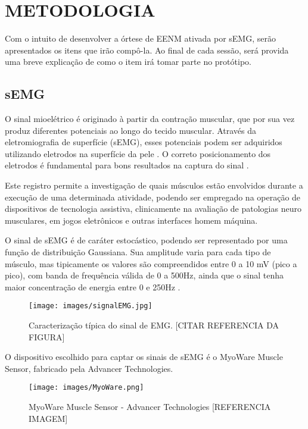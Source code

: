\documentclass[rascunho,xindy]{fei}
\begin{document}
\chapter{METODOLOGIA}

Com o intuito de desenvolver a órtese de EENM ativada por sEMG, serão apresentados os itens que irão compô-la. Ao final de cada sessão, será provida uma breve explicação de como o item irá tomar parte no protótipo.


\section{sEMG}

O sinal mioelétrico é originado à partir da contração muscular, que por sua vez produz diferentes potenciais ao longo do tecido muscular. Através da eletromiografia de superfície (sEMG), esses potenciais podem ser adquiridos utilizando eletrodos na superfície da pele \cite{merletti2004}. O correto posicionamento dos eletrodos é fundamental para bons resultados na captura do sinal \cite{farrell2008comparison}.

Este registro permite a investigação de quais músculos estão envolvidos durante a execução de uma determinada atividade, podendo ser empregado na operação de dispositivos de tecnologia assistiva, clinicamente na avaliação de patologias neuro musculares, em jogos eletrônicos e outras interfaces homem máquina.

O sinal de sEMG é de caráter estocástico, podendo ser representado por uma função de distribuição Gaussiana. Sua amplitude varia para cada tipo de músculo, mas tipicamente os valores são compreendidos entre 0 a 10 mV (pico a pico), com banda de frequência válida de 0 a 500Hz, ainda que o sinal tenha maior concentração de energia entre 0 e 250Hz \cite{deluca2002surface}.

\begin{figure}[!htb]
\centering
\texttt{[image: images/signalEMG.jpg]}
\caption{Caracterização típica do sinal de EMG. [CITAR REFERENCIA DA FIGURA]}
\label{signalEMG}
\end{figure}

O dispositivo escolhido para captar os sinais de sEMG é o MyoWare Muscle Sensor, fabricado pela Advancer Technologies.

\begin{figure}[!htb]
\centering
\texttt{[image: images/MyoWare.png]}
\caption{ MyoWare Muscle Sensor - Advancer Technologies [REFERENCIA IMAGEM]}
\label{MyoWare}
\end{figure}
\end{document}
